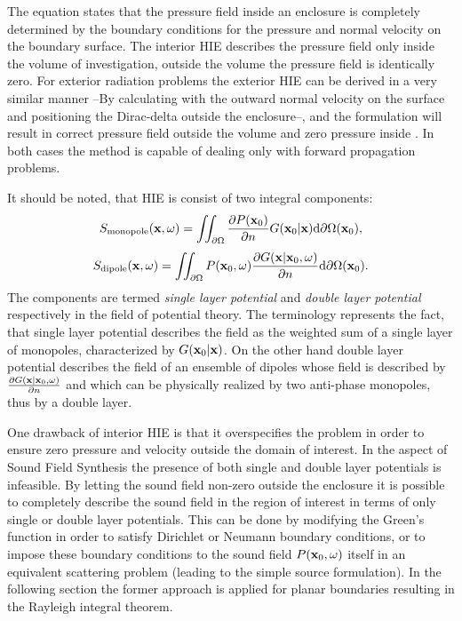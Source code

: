 The equation states that the pressure field inside an enclosure is completely determined by the boundary conditions for the pressure and normal velocity on the boundary surface.
The interior HIE describes the pressure field only inside the volume of investigation, outside the volume the pressure field is identically zero. For exterior radiation problems the exterior HIE can be derived in a very similar manner --By calculating with the outward normal velocity on the surface and positioning the Dirac-delta outside the enclosure--, and the formulation will result in correct pressure field outside the volume and zero pressure inside \cite{Williams1999}.
In both cases the method is capable of dealing only with forward propagation problems.
\vspace{3mm}

It should be noted, that HIE is consist of two integral components:
\begin{equation}
S_{\mathrm{monopole}}(\mathbf{x},\omega) = 
\iint_{\partial \Omega}  \frac{\partial P(\mathbf{x}_0)}{\partial n} G(\mathbf{x}_0|\mathbf{x}) \mathrm{d} \partial \Omega (\mathbf{x}_0),
\label{Eq:Theory:Single_Layer_Potential}
\end{equation}
\begin{equation}
S_{\mathrm{dipole}}(\mathbf{x},\omega) = 
\iint_{\partial \Omega}  P(\mathbf{x}_0,\omega)  \frac{\partial G(\mathbf{x}|\mathbf{x}_0,\omega)}{\partial n}   \mathrm{d} \partial \Omega (\mathbf{x}_0).
\label{Eq:Theory:Double_Layer_Potential}
\end{equation}
The components are termed \emph{single layer potential} and \emph{double layer potential} respectively in the field of potential theory. The terminology represents the fact, that single layer potential describes the field as the weighted sum of a single layer of monopoles, characterized by $ G(\mathbf{x}_0|\mathbf{x}) $. On the other hand double layer potential describes the field of an ensemble of dipoles whose field is described by 
$\frac{\partial G(\mathbf{x}|\mathbf{x}_0,\omega)}{\partial n}$ and which can be physically realized by two anti-phase monopoles, thus by a double layer.

\vspace{3mm}
One drawback of interior HIE is that it overspecifies the problem in order to ensure zero pressure and velocity outside the domain of interest. In the aspect of Sound Field Synthesis the presence of both single and double layer potentials is infeasible. By letting the sound field non-zero outside the enclosure it is possible to completely describe the sound field in the region of interest in terms of only single or double layer potentials.
This can be done by modifying the Green's function in order to satisfy Dirichlet or Neumann boundary conditions, or to impose these boundary conditions to the sound field $ P(\mathbf{x}_0,\omega) $ itself in an equivalent scattering problem (leading to the simple source formulation).
In the following section the former approach is applied for planar boundaries resulting in the Rayleigh integral theorem.

